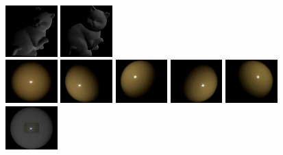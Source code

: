 \includegraphics[width=0.150\textwidth]{ch-psfcn/images/Method/Cat_Normalized/4.0_1_2_88.png}
\includegraphics[width=0.150\textwidth]{ch-psfcn/images/Method/Cat_Normalized/4.0_1_2_95.png}
\\
\includegraphics[width=0.150\textwidth]{ch-psfcn/images/Method/Ball_Normalized/4.0_004.png}
\includegraphics[width=0.150\textwidth]{ch-psfcn/images/Method/Ball_Normalized/4.0_041.png}
\includegraphics[width=0.150\textwidth]{ch-psfcn/images/Method/Ball_Normalized/4.0_048.png}
\includegraphics[width=0.150\textwidth]{ch-psfcn/images/Method/Ball_Normalized/4.0_089.png}
\includegraphics[width=0.150\textwidth]{ch-psfcn/images/Method/Ball_Normalized/4.0_096.png}
\\
\includegraphics[width=0.150\textwidth]{ch-psfcn/images/Method/Ball_Normalized/4.0_1_1_3.png}
